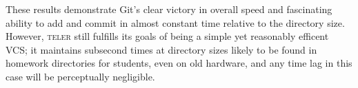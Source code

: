 \documentclass[11pt, letterpaper]{article}
\begin{document}
\begin{multicols}{2}
These results demonstrate Git's clear victory in overall speed and fascinating
ability to add and commit in almost constant time relative to the directory
size. However, \textsc{teler} still fulfills its goals of being a simple yet
reasonably efficent VCS; it maintains subsecond times at directory sizes likely
to be found in homework directories for students, even on old hardware, and any
time lag in this case will be perceptually negligible.

\end{multicols}
\end{document}
